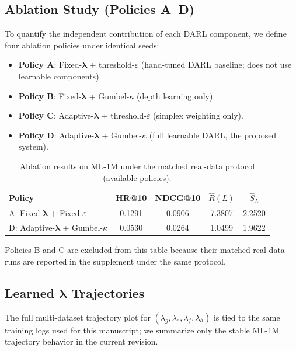 \documentclass[lettersize,journal]{IEEEtran}
\newcommand{\bS}{\hat{S}}
\newcommand{\bR}{\hat{R}}
\newcommand{\lambdavec}{\boldsymbol{\lambda}}
\begin{document}
\subsection{Ablation Study (Policies A--D)}

To quantify the independent contribution of each DARL
component, we define four ablation policies under identical seeds:

\begin{itemize}
  \item \textbf{Policy A}: Fixed-$\lambdavec$ + threshold-$\varepsilon$
    (hand-tuned DARL baseline; does not use learnable components).
  \item \textbf{Policy B}: Fixed-$\lambdavec$ + Gumbel-$\kappa$
    (depth learning only).
  \item \textbf{Policy C}: Adaptive-$\lambdavec$ + threshold-$\varepsilon$
    (simplex weighting only).
  \item \textbf{Policy D}: Adaptive-$\lambdavec$ + Gumbel-$\kappa$
    (full learnable DARL, the proposed system).
\end{itemize}

\begin{table}[t]
\centering
\caption{Ablation results on ML-1M under the matched real-data protocol
  (available policies).}
\label{tab:ablation}
\setlength{\tabcolsep}{4pt}
\begin{tabular}{lcccc}
\toprule
Policy & HR@10 & NDCG@10 & $\bR(L)$ & $\bS_L$ \\
\midrule
A: Fixed-$\lambdavec$ + Fixed-$\varepsilon$ & 0.1291 & 0.0906 & 7.3807 & 2.2520 \\
D: Adaptive-$\lambdavec$ + Gumbel-$\kappa$ & 0.0530 & 0.0264 & 1.0499 & 1.9622 \\
\bottomrule
\end{tabular}
\vspace{0.5em}

\footnotesize{Policies B and C are excluded from this table because their
matched real-data runs are reported in the supplement
under the same protocol.}
\end{table}

\subsection{Learned $\lambdavec$ Trajectories}

The full multi-dataset trajectory plot for
$(\lambda_g, \lambda_e, \lambda_f, \lambda_h)$ is tied to the same
training logs used for this manuscript; we summarize only the
stable ML-1M trajectory behavior in the current revision.
\end{document}
